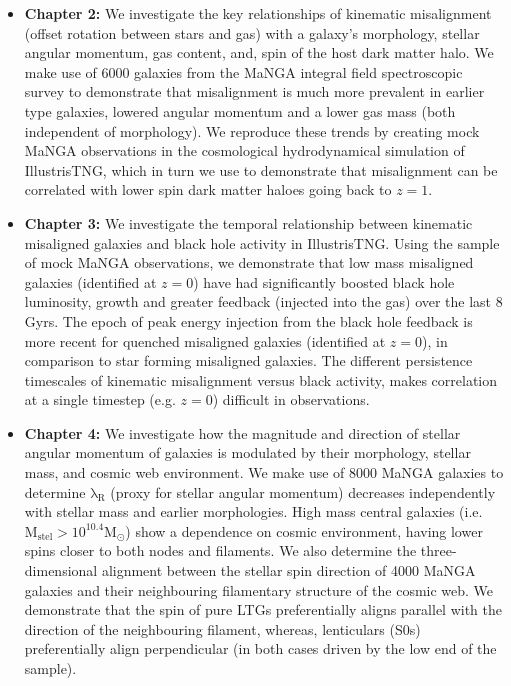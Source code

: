 \begin{itemize}
    \item \textbf{Chapter 2:} We investigate the key relationships of kinematic misalignment (offset rotation between stars and gas) with a galaxy's morphology, stellar angular momentum, gas content, and, spin of the host dark matter halo. We make use of 6000 galaxies from the MaNGA integral field spectroscopic survey to demonstrate that misalignment is much more prevalent in earlier type galaxies, lowered angular momentum and a lower gas mass (both independent of morphology). We reproduce these trends by creating mock MaNGA observations in the cosmological hydrodynamical simulation of IllustrisTNG, which in turn we use to demonstrate that misalignment can be correlated with lower spin dark matter haloes going back to $z=1$.
    
    \item \textbf{Chapter 3:} We investigate the temporal relationship between kinematic misaligned galaxies and black hole activity in IllustrisTNG. Using the sample of mock MaNGA observations, we demonstrate that low mass misaligned galaxies (identified at $z=0$) have had significantly boosted black hole luminosity, growth and greater feedback (injected into the gas) over the last 8 Gyrs. The epoch of peak energy injection from the black hole feedback is more recent for quenched misaligned galaxies (identified at $z=0$), in comparison to star forming misaligned galaxies. The different persistence timescales of kinematic misalignment versus black activity, makes correlation at a single timestep (e.g. $z=0$) difficult in observations.
    
    \item \textbf{Chapter 4:} We investigate how the magnitude and direction of stellar angular momentum of galaxies is modulated by their morphology, stellar mass, and cosmic web environment. We make use of 8000 MaNGA galaxies to determine $\mathrm{\lambda_R}$ (proxy for stellar angular momentum) decreases independently with stellar mass and earlier morphologies. High mass central galaxies (i.e. $\mathrm{M_{stel} > 10^{10.4}M_{\odot}}$) show a dependence on cosmic environment, having lower spins closer to both nodes and filaments. We also determine the three-dimensional alignment between the stellar spin direction of 4000 MaNGA galaxies and their neighbouring filamentary structure of the cosmic web. We demonstrate that the spin of pure LTGs preferentially aligns parallel with the direction of the neighbouring filament, whereas, lenticulars (S0s) preferentially align perpendicular (in both cases driven by the low end of the sample).
    

\end{itemize}
